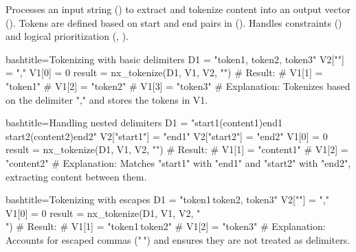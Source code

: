 \begin{NexMainBox}
	\begin{NexMainBox}
		Processes an input string () to extract and tokenize content into an output vector (). Tokens are defined based on start and end pairs in (). Handles constraints () and logical prioritization (, ).
	\end{NexMainBox}
	\begin{NexMainBox}
		\begin{NexListDark}
		\end{NexListDark}
	\end{NexMainBox}
\end{NexMainBox}

\begin{NexCodeBox}{bash}{title={Tokenizing with basic delimiters}}
	D1 = "token1, token2, token3"
	V2[""] = ","
	V1[0] = 0
	result = nx_tokenize(D1, V1, V2, "")
	# Result:
	# V1[1] = "token1"
	# V1[2] = "token2"
	# V1[3] = "token3"
	# Explanation: Tokenizes based on the delimiter "," and stores the tokens in V1.
\end{NexCodeBox}

\begin{NexCodeBox}{bash}{title={Handling nested delimiters}}
	D1 = "start1(content1)end1 start2(content2)end2"
	V2["start1"] = "end1"
	V2["start2"] = "end2"
	V1[0] = 0
	result = nx_tokenize(D1, V1, V2, "")
	# Result:
	# V1[1] = "content1"
	# V1[2] = "content2"
	# Explanation: Matches "start1" with "end1" and "start2" with "end2", extracting content between them.
\end{NexCodeBox}

\begin{NexCodeBox}{bash}{title={Tokenizing with escapes}}
	D1 = "token1\,token2, token3"
	V2[""] = ","
	V1[0] = 0
	result = nx_tokenize(D1, V1, V2, "\\")
	# Result:
	# V1[1] = "token1\,token2"
	# V1[2] = "token3"
	# Explanation: Accounts for escaped commas ("\,") and ensures they are not treated as delimiters.
\end{NexCodeBox}

